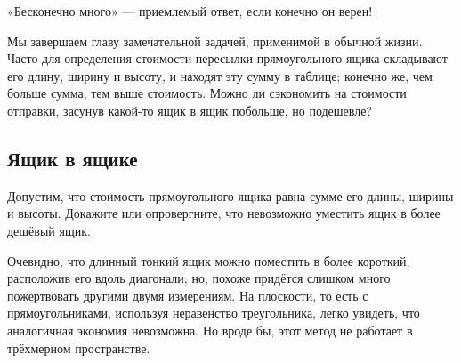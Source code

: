  «Бесконечно много» --- приемлемый ответ, если конечно он верен!

\medskip

Мы завершаем главу замечательной задачей, применимой в обычной жизни.
Часто для определения стоимости пересылки прямоугольного ящика складывают его длину, ширину и высоту,
и находят эту сумму в таблице;
конечно же, чем больше сумма, тем выше стоимость.
Можно ли сэкономить на стоимости отправки, засунув какой-то ящик в ящик побольше, но подешевле?

\subsection*{Ящик в ящике}

Допустим, что стоимость прямоугольного ящика равна сумме его длины, ширины и высоты.
Докажите или опровергните, что невозможно уместить ящик в более дешёвый ящик.

Очевидно, что длинный тонкий ящик можно поместить в более короткий, расположив его вдоль диагонали;
но, похоже придётся слишком много пожертвовать другими двумя измерениям.
На плоскости, то есть с прямоугольниками, используя неравенство треугольника, легко увидеть, что аналогичная экономия невозможна.
Но вроде бы, этот метод не работает в трёхмерном пространстве.
